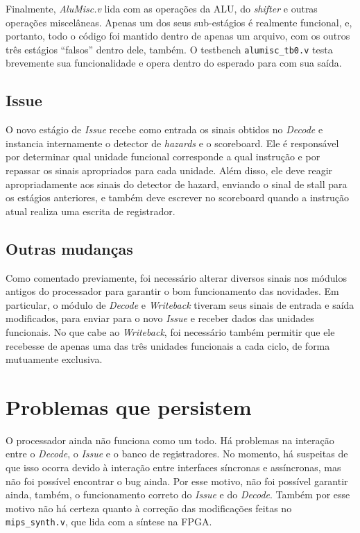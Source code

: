 \documentclass[12pt,a4paper]{article}
\numberwithin{equation}{section}
\begin{document}
Finalmente, \emph{AluMisc.v} lida com as operações da ALU, do \emph{shifter} e outras operações miscelâneas. Apenas um dos seus sub-estágios é realmente funcional, e, portanto, todo o código foi mantido dentro de apenas um arquivo, com os outros três estágios ``falsos'' dentro dele, também. O testbench \verb|alumisc_tb0.v| testa brevemente sua funcionalidade e opera dentro do esperado para com sua saída.

\subsection{Issue}

O novo estágio de \emph{Issue} recebe como entrada os sinais obtidos no \emph{Decode} e instancia internamente o detector de \emph{hazards} e o scoreboard. Ele é responsável por determinar qual unidade funcional corresponde a qual instrução e por repassar os sinais apropriados para cada unidade. Além disso, ele deve reagir apropriadamente aos sinais do detector de hazard, enviando o sinal de stall para os estágios anteriores, e também deve escrever no scoreboard quando a instrução atual realiza uma escrita de registrador.

\subsection{Outras mudanças}

Como comentado previamente, foi necessário alterar diversos sinais nos módulos antigos do processador para garantir o bom funcionamento das novidades. Em particular, o módulo de \emph{Decode} e \emph{Writeback} tiveram seus sinais de entrada e saída modificados, para enviar para o novo \emph{Issue} e receber dados das unidades funcionais. No que cabe ao \emph{Writeback}, foi necessário também permitir que ele recebesse de apenas uma das três unidades funcionais a cada ciclo, de forma mutuamente exclusiva.

\section{Problemas que persistem}

O processador ainda não funciona como um todo. Há problemas na interação entre o \emph{Decode}, o \emph{Issue} e o banco de registradores. No momento, há suspeitas de que isso ocorra devido à interação entre interfaces síncronas e assíncronas, mas não foi possível encontrar o bug ainda. Por esse motivo, não foi possível garantir ainda, também, o funcionamento correto do \emph{Issue} e do \emph{Decode}. Também por esse motivo não há certeza quanto à correção das modificações feitas no \verb|mips_synth.v|, que lida com a síntese na FPGA.
\end{document}
